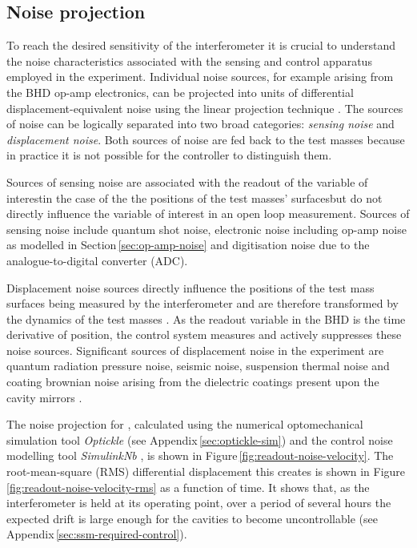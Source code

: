 \subsection{Noise projection}

To reach the desired sensitivity of the interferometer it is crucial to understand the noise characteristics associated with the sensing and control apparatus employed in the experiment. Individual noise sources, for example arising from the \gls{BHD} op-amp electronics, can be projected into units of differential displacement-equivalent noise using the linear projection technique \cite{Smith2006}. The sources of noise can be logically separated into two broad categories: \emph{sensing noise} and \emph{displacement noise}. Both sources of noise are fed back to the test masses because in practice it is not possible for the controller to distinguish them.

Sources of sensing noise are associated with the readout of the variable of interest\textemdash in the case of the \SSM{} the positions of the test masses' surfaces\textemdash but do not directly influence the variable of interest in an open loop measurement. Sources of sensing noise include quantum shot noise, electronic noise including op-amp noise as modelled in Section\,\ref{sec:op-amp-noise} and digitisation noise due to the analogue-to-digital converter (\gls{ADC}).

Displacement noise sources directly influence the positions of the test mass surfaces being measured by the interferometer and are therefore transformed by the dynamics of the test masses \cite{Danilishin2015}. As the readout variable in the \gls{BHD} is the time derivative of position, the control system measures and actively suppresses these noise sources. Significant sources of displacement noise in the \SSM{} experiment are quantum radiation pressure noise, seismic noise, suspension thermal noise \cite{Hammond2012} and coating brownian noise arising from the dielectric coatings present upon the cavity mirrors \cite{Harry2002}.

The noise projection for \LMINUS{}, calculated using the numerical optomechanical simulation tool \emph{Optickle} \cite{Evans2012} (see Appendix\,\ref{sec:optickle-sim}) and the control noise modelling tool \emph{SimulinkNb} \cite{SimulinkNb}, is shown in Figure\,\ref{fig:readout-noise-velocity}. The root-mean-square (\gls{RMS}) differential displacement this creates is shown in Figure\,\ref{fig:readout-noise-velocity-rms} as a function of time. It shows that, as the interferometer is held at its operating point, over a period of several hours the expected drift is large enough for the cavities to become uncontrollable (see Appendix\,\ref{sec:ssm-required-control}).

